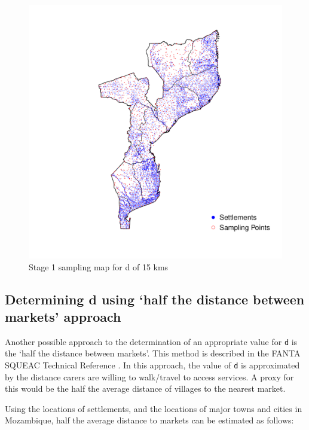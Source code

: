 \documentclass[
  12pt,
  a4paper]{article}
\begin{document}
\begin{figure}[H]

{\centering \includegraphics{mozambiqueNotes_files/figure-latex/stage1plot15-1} 

}

\caption{Stage 1 sampling map for d of 15 kms}\label{fig:stage1plot15}
\end{figure}

\hypertarget{determining-d-using-half-the-distance-between-markets-approach}{%
\subsection{Determining d using `half the distance between markets' approach}\label{determining-d-using-half-the-distance-between-markets-approach}}

Another possible approach to the determination of an appropriate value for \texttt{d} is the `half the distance between markets'. This method is described in the FANTA SQUEAC Technical Reference \citep{Myatt:2012tta}. In this approach, the value of \texttt{d} is approximated by the distance carers are willing to walk/travel to access services. A proxy for this would be the half the average distance of villages to the nearest market.

Using the locations of settlements, and the locations of major towns and cities in Mozambique, half the average distance to markets can be estimated as follows:
\end{document}
